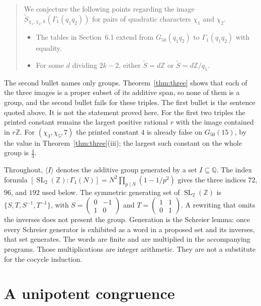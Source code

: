 \documentclass[11pt]{article}
\theoremstyle{remark}
\newcommand{\tS}{\widetilde{S}}
\newcommand{\Z}{\mathbb{Z}}
\newcommand{\Q}{\mathbb{Q}}
\newcommand{\SL}{\operatorname{SL}}
\begin{document}
\begin{quote}
We conjecture the following points regarding the image \(\tS_{\chi_1,\chi_2,k}(\Gamma_1(q_1q_2))\) for pairs of quadratic characters \(\chi_1\) and \(\chi_2\).
\begin{itemize}
\item The tables in Section~6.1 extend from \(G_{50}(q_1q_2)\) to \(\Gamma_1(q_1q_2)\) with equality.
\item For some \(d\) dividing \(2k-2\), either \(\tS=d\Z\) or \(\tS=d\Z/q_1\).
\end{itemize}
\end{quote}

The second bullet names only groups.
Theorem~\ref{thm:three} shows that each of the three images is a proper subset of its additive span, so none of them is a group, and the second bullet fails for these triples.
The first bullet is the sentence quoted above.
It is not the statement proved here.
For the first two triples the printed constant remains the largest positive rational \(r\) with the image contained in \(r\Z\).
For \((\chi_3,\chi_5,7)\) the printed constant \(4\) is already false on \(G_{50}(15)\), by the value in Theorem~\ref{thm:three}(iii); the largest such constant on the whole group is \(\tfrac43\).

Throughout, \(\langle I\rangle\) denotes the additive group generated by a set \(I\subseteq\Q\).
The index formula \([\SL_2(\Z):\Gamma_1(N)]=N^2\prod_{p\mid N}(1-1/p^2)\) gives the three indices \(72\), \(96\), and \(192\) used below.
The symmetric generating set of \(\SL_2(\Z)\) is \(\{S,T,S^{-1},T^{-1}\}\), with \(S=\begin{pmatrix}0&-1\\1&0\end{pmatrix}\) and \(T=\begin{pmatrix}1&1\\0&1\end{pmatrix}\).
A rewriting that omits the inverses does not present the group.
Generation is the Schreier lemma: once every Schreier generator is exhibited as a word in a proposed set and its inverses, that set generates.
The words are finite and are multiplied in the accompanying programs.
Those multiplications are integer arithmetic.
They are not a substitute for the cocycle induction.

\section{A unipotent congruence}
\label{sec:lemma}
\end{document}

